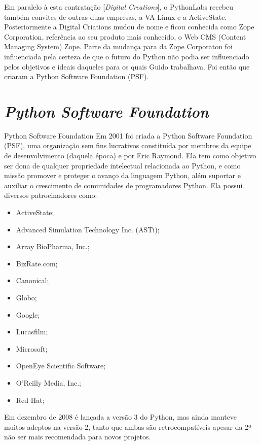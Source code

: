 Em paralelo à esta contratação [\textit{Digital Creations}], o PythonLabs recebeu também convites de outras duas empresas, a VA Linux e a ActiveState.
Posteriormente a Digital Criations mudou de nome e ficou conhecida como Zope Corporation, referência ao seu produto mais conhecido, o Web CMS (Content Managing System) Zope.
Parte da mudança para da Zope Corporaton foi influenciada pela certeza de que o futuro do Python não podia ser influenciado pelos objetivos e ideais daqueles para os quais Guido trabalhava.
Foi então que criaram a Python Software Foundation (PSF).

\section{\textit{Python Software Foundation}}
\label{sec:python-software-foundation}
Python Software Foundation
Em 2001 foi criada a Python Software Foundation (PSF), uma organização sem fins lucrativos constituída por membros da equipe de desenvolvimento (daquela época) e por Eric Raymond.
Ela tem como objetivo ser dona de qualquer propriedade intelectual relacionada ao Python, e como missão promover e proteger o avanço da linguagem Python, além suportar e auxiliar o crescimento de comunidades de programadores Python.
Ela possui diversos patrocinadores como:
\begin{itemize}
    \item ActiveState;
    \item Advanced Simulation Technology Inc. (ASTi);
    \item Array BioPharma, Inc.;
    \item BizRate.com;
    \item Canonical;
    \item Globo;
    \item Google;
    \item Lucasfilm;
    \item Microsoft;
    \item OpenEye Scientific Software;
    \item O’Reilly Media, Inc.;
    \item Red Hat;


\end{itemize}
 
 
Em dezembro de 2008 é lançada a versão 3 do Python, mas ainda manteve muitos adeptos na versão 2, tanto que ambas são retrocompatíveis apesar da 2ª não ser mais recomendada para novos projetos.
 
